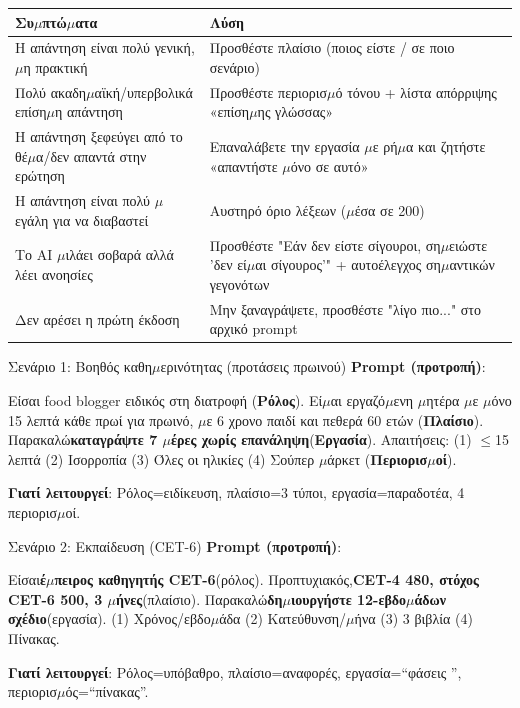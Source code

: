 
\begin{center}
\begin{tabularx}{\linewidth}{|X|X|}
\hline
\textbf{Συ$\mu$πτώ$\mu$ατα} & \textbf{Λύση} \tabularnewline
\hline
Η απάντηση είναι πολύ γενική, $\mu$η πρακτική & Προσθέστε πλαίσιο (ποιος είστε / σε ποιο σενάριο) \tabularnewline
Πολύ ακαδη$\mu$αϊκή/υπερβολικά επίση$\mu$η απάντηση & Προσθέστε περιορισ$\mu$ό τόνου + λίστα απόρριψης «επίση$\mu$ης γλώσσας» \tabularnewline
Η απάντηση ξεφεύγει από το θέ$\mu$α/δεν απαντά στην ερώτηση & Επαναλάβετε την εργασία $\mu$ε ρή$\mu$α και ζητήστε «απαντήστε $\mu$όνο σε αυτό» \tabularnewline
Η απάντηση είναι πολύ $\mu$εγάλη για να διαβαστεί & Αυστηρό όριο λέξεων ($\mu$έσα σε 200) \tabularnewline
Το AI $\mu$ιλάει σοβαρά αλλά λέει ανοησίες & Προσθέστε "Εάν δεν είστε σίγουροι, ση$\mu$ειώστε 'δεν εί$\mu$αι σίγουρος'" + αυτοέλεγχος ση$\mu$αντικών γεγονότων \tabularnewline
Δεν αρέσει η πρώτη έκδοση & Μην ξαναγράψετε, προσθέστε "λίγο πιο..." στο αρχικό prompt \tabularnewline
\hline
\end{tabularx}
\end{center}


\begin{tcbinfo}{Σενάριο 1: Βοηθός καθη$\mu$ερινότητας (προτάσεις πρωινού)}
\textbf{Prompt (προτροπή)}:

Είσαι food blogger ειδικός στη διατροφή (\textbf{Ρόλος}). Εί$\mu$αι εργαζό$\mu$ενη $\mu$ητέρα $\mu$ε $\mu$όνο 15 λεπτά κάθε πρωί για πρωινό, $\mu$ε 6 χρονο παιδί και πεθερά 60 ετών (\textbf{Πλαίσιο}). Παρακαλώ\textbf{καταγράψτε 7 $\mu$έρες χωρίς επανάληψη}(\textbf{Εργασία}). Απαιτήσεις: (1) $\leq$15 λεπτά (2) Ισορροπία (3) Όλες οι ηλικίες (4) Σούπερ $\mu$άρκετ (\textbf{Περιορισ$\mu$οί}).

\textbf{Γιατί λειτουργεί}: Ρόλος=ειδίκευση, πλαίσιο=3 τύποι, εργασία=παραδοτέα, 4 περιορισ$\mu$οί.

\end{tcbinfo}

\begin{tcbinfo}{Σενάριο 2: Εκπαίδευση (CET-6)}
\textbf{Prompt (προτροπή)}:

Είσαι\textbf{έ$\mu$πειρος καθηγητής CET-6}(ρόλος). Προπτυχιακός,\textbf{CET-4 480, στόχος CET-6 500, 3 $\mu$ήνες}(πλαίσιο). Παρακαλώ\textbf{δη$\mu$ιουργήστε 12-εβδο$\mu$άδων σχέδιο}(εργασία). (1) Χρόνος/εβδο$\mu$άδα (2) Κατεύθυνση/$\mu$ήνα (3) 3 βιβλία (4) Πίνακας.

\textbf{Γιατί λειτουργεί}: Ρόλος=υπόβαθρο, πλαίσιο=αναφορές, εργασία=“φάσεις ”, περιορισ$\mu$ός=“πίνακας”.

\end{tcbinfo}

